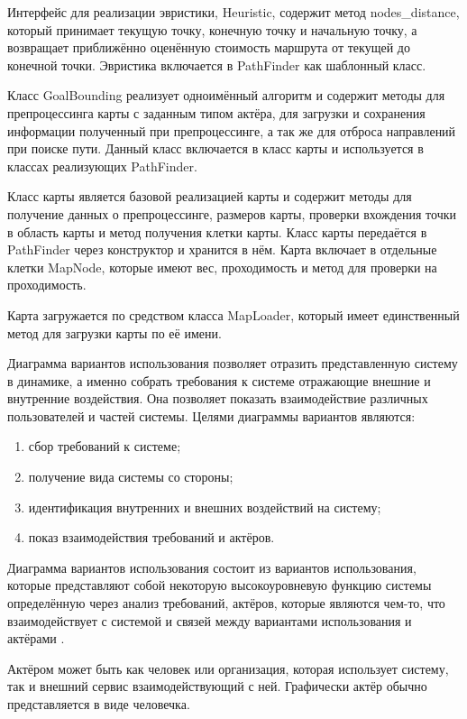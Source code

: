 
Интерфейс для реализации эвристики, Heuristic, содержит метод nodes\_distance, который принимает текущую точку, конечную точку и начальную точку, а возвращает приближённо оценённую стоимость маршрута от текущей до конечной точки. Эвристика включается в PathFinder как шаблонный класс.

Класс GoalBounding реализует одноимённый алгоритм и содержит методы для препроцессинга карты с заданным типом актёра, для загрузки и сохранения информации полученный при препроцессинге, а так же для отброса направлений при поиске пути. Данный класс включается в класс карты и используется в классах реализующих PathFinder.

Класс карты является базовой реализацией карты и содержит методы для получение данных о препроцессинге, размеров карты, проверки вхождения точки в область карты и метод получения клетки карты. Класс карты передаётся в PathFinder через конструктор и хранится в нём. Карта включает в отдельные клетки MapNode, которые имеют вес, проходимость и метод для проверки на проходимость.

Карта загружается по средством класса MapLoader, который имеет единственный метод для загрузки карты по её имени.

Диаграмма вариантов использования позволяет отразить представленную систему в динамике, а именно собрать требования к системе отражающие внешние и внутренние воздействия. Она позволяет показать взаимодействие различных пользователей и частей системы. Целями диаграммы вариантов являются:

\begin{enumerate}
	\item сбор требований к системе;
	\item получение вида системы со стороны;
	\item идентификация внутренних и внешних воздействий на систему;
	\item показ взаимодействия требований и актёров.
\end{enumerate}

Диаграмма вариантов использования состоит из вариантов использования, которые представляют собой некоторую высокоуровневую функцию системы определённую через анализ требований, актёров, которые являются чем-то, что взаимодействует с системой и связей между вариантами использования и актёрами \cite{USE_CASE}.

Актёром может быть как человек или организация, которая использует систему, так и внешний сервис взаимодействующий с ней. Графически актёр обычно представляется в виде человечка.

